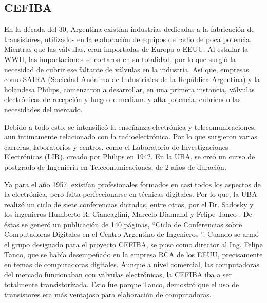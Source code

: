 \documentclass[%
 	final,
%
	notitlepage,
	narroweqnarray,
	inline,
 	twoside,
	]{ieee}
\begin{document}
\subsection*{CEFIBA}

En la d\'ecada del 30, Argentina exist\'ian industrias dedicadas a la fabricaci\'on de transistores, utilizados en la elaboraci\'on de equipos de radio de poca potencia. Mientras que las v\'alvulas, eran importadas de Europa o EEUU. Al estallar la WWII, las importaciones se cortaron en su totalidad, por lo que surgi\'o la necesidad de cubrir ese faltante de v\'alvulas en la industria. As\'i que, empresas como SAIRA (Sociedad An\'onima de Industriales de la Rep\'ublica Argentina) y la holandesa Philips, comenzaron a desarrollar, en una primera instancia, v\'alvulas electr\'onicas de recepci\'on y luego de mediana y alta potencia, cubriendo las necesidades del mercado.

Debido a todo esto, se intensific\'o la ense\~nanza electr\'onica y telecomunicaciones, aun \'intimamente relacionado con la radioelectr\'onica. Por lo que surgieron varias carreras, laboratorios y centros, como el Laboratorio de Investigaciones Electr\'onicas (LIR), creado por Philips en 1942. En la UBA, se cre\'o un curso de postgrado de Ingenier\'ia en Telecomunicaciones, de 2 a\~nos de duraci\'on.

Ya para el a\~no 1957, exist\'ian profesionales formados en casi todos los aspectos de la electr\'onica, pero falta perfeccionarse en t\'ecnicas digitales. Por lo que, la UBA realiz\'o un ciclo de siete conferencias dictadas, entre otros, por el Dr. Sadosky y los ingenieros Humberto R. Ciancaglini, Marcelo Diamand y Felipe Tanco . De \'estas se gener\'o un publicaci\'on de 140 p\'aginas, “Ciclo de Conferencias sobre Computadoras Digitales en el Centro Argentino de Ingenieros ”.
Cuando se arm\'o el grupo designado para el proyecto CEFIBA, se puso como director al Ing. Felipe Tanco, que se hab\'ia desempe\~nado en la empresa RCA de los EEUU, precisamente en temas de computadoras digitales. Aunque a nivel comercial, las computadoras del mercado funcionaban con v\'alvulas electr\'onicas, la CEFIBA iba a ser totalmente transistorizada. Esto fue porque Tanco, demostr\'o que el uso de transistores era m\'as ventajoso para elaboraci\'on de computadoras.
\end{document}
